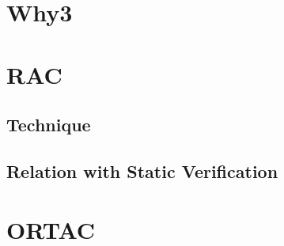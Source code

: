 \section{Why3}
\label{sec:why3}

\section{RAC}
\label{sec:rac}

\subsection{Technique}
\label{sub:technique}

\subsection{Relation with Static Verification}
\label{sub:relation_with_static_verification}

\section{ORTAC}
\label{sec:ortac}